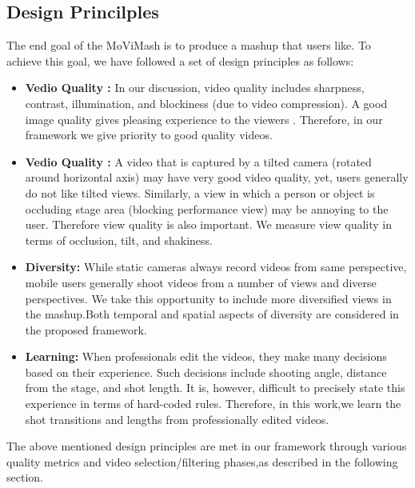 \documentclass{sig-alternate}
\begin{document}
\subsection{Design Princilples}
The end goal of the MoViMash is to produce a mashup that users like. To achieve this goal, we have followed a set of design principles as follows:
\begin{itemize}
    \item \textbf{Vedio Quality : }In our discussion, video quality includes sharpness, contrast, illumination, and blockiness (due to video compression). A good image quality gives pleasing experience to the viewers \cite{web:10}. Therefore, in our framework we give priority to good quality videos.
    \item \textbf{Vedio Quality : }A video that is captured by a tilted camera (rotated around horizontal axis) may have very good video quality, yet, users generally do not like tilted views. Similarly, a view in which a person or object is occluding stage area (blocking performance view) may be annoying to the user. Therefore view quality is also important. We measure view quality in terms of occlusion, tilt, and shakiness.
    \item \textbf{Diversity: }While static cameras always record videos from same perspective, mobile users generally shoot videos from a number of views and diverse perspectives. We take this opportunity to include more diversified views in the mashup.Both temporal and spatial aspects of diversity are considered in the proposed framework.
    \item \textbf{Learning: }When professionals edit the videos, they make many decisions based on their experience. Such decisions include shooting angle, distance from the stage, and shot length. It is, however, difficult to precisely state this experience in terms of hard-coded rules. Therefore, in this work,we learn the shot transitions and lengths from professionally edited videos.
\end{itemize}
The above mentioned design principles are met in our framework through various quality metrics and video selection/filtering phases,as described in the following section.
\end{document}
